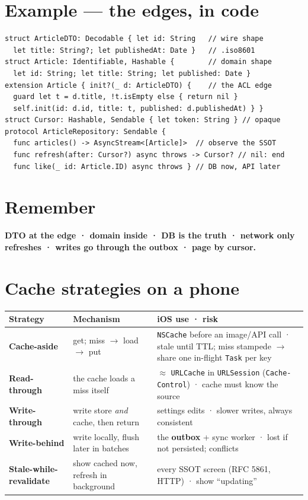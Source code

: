 \documentclass[8pt]{extarticle}
\begin{document}
\begin{multicols}{2}
\section{Example — the edges, in code}
\begin{lstlisting}[language=SwiftSheet]
struct ArticleDTO: Decodable { let id: String   // wire shape
  let title: String?; let publishedAt: Date }   // .iso8601
struct Article: Identifiable, Hashable {        // domain shape
  let id: String; let title: String; let published: Date }
extension Article { init?(_ d: ArticleDTO) {    // the ACL edge
  guard let t = d.title, !t.isEmpty else { return nil }
  self.init(id: d.id, title: t, published: d.publishedAt) } }
struct Cursor: Hashable, Sendable { let token: String } // opaque
protocol ArticleRepository: Sendable {
  func articles() -> AsyncStream<[Article]>  // observe the SSOT
  func refresh(after: Cursor?) async throws -> Cursor? // nil: end
  func like(_ id: Article.ID) async throws } // DB now, API later
\end{lstlisting}

\section{Remember}
\textbf{DTO at the edge · domain inside · DB is the truth · network only refreshes · writes go
through the outbox · page by cursor.}

\columnbreak

\section{Cache strategies on a phone}
{\footnotesize\setlength\tabcolsep{2pt}\renewcommand{\arraystretch}{1.05}
\begin{tabularx}{\linewidth}{@{}L{14mm}L{23mm}>{\raggedright\arraybackslash}X@{}}
\toprule
\textbf{Strategy} & \textbf{Mechanism} & \textbf{iOS use · risk} \\
\midrule
\textbf{Cache-aside} & get; miss $\to$ load $\to$ put & \texttt{NSCache} before an image/API call ·
stale until TTL; miss stampede $\to$ share one in-flight \texttt{Task} per key \\
\textbf{Read-through} & the cache loads a miss itself & $\approx$ \texttt{URLCache} in
\texttt{URLSession} (\texttt{Cache-Control}) · cache must know the source \\
\textbf{Write-through} & write store \emph{and} cache, then return & settings edits · slower
writes, always consistent \\
\textbf{Write-behind} & write locally, flush later in batches & the \textbf{outbox} + sync
worker · lost if not persisted; conflicts \\
\textbf{Stale-while-} \textbf{revalidate} & show cached now, refresh in background & every SSOT
screen (RFC 5861, HTTP) · show ``updating'' \\
\bottomrule
\end{tabularx}}


\end{multicols}
\end{document}

